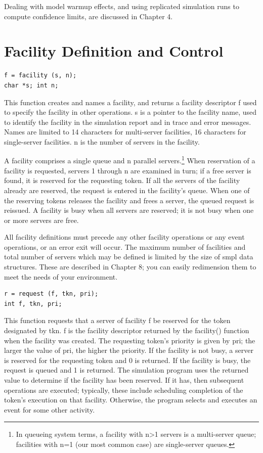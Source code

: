 Dealing with model warmup effects, and using replicated simulation runs to
compute confidence limits, are discussed in Chapter 4.

\section{Facility Definition and Control}
\label{sec:smpl-facility-definition}

\begin{verbatim}
f = facility (s, n);
char *s; int n;
\end{verbatim}

This function creates and names a facility, and returns a facility descriptor
f used to specify the facility in other operations. s is a pointer to the
facility name, used to identify the facility in the simulation report and in
trace and error messages. Names are limited to 14 characters for multi-server
facilities, 16 characters for single-server facilities. n is the number of
servers in the facility.

A facility comprises a single queue and n parallel servers.\footnote{In
queueing system terms, a facility with n>1 servers is a multi-server queue;
facilities with n=1 (our most common case) are single-server queues.} When
reservation of a facility is requested, servers 1 through n are examined in
turn; if a free server is found, it is reserved for the requesting token. If
all the servers of the facility already are reserved, the request is entered
in the facility's queue. When one of the reserving tokens releases the
facility and frees a server, the queued request is reissued. A facility is
busy when all servers are reserved; it is not busy when one or more servers
are free.

All facility definitions must precede any other facility operations or any
event operations, or an error exit will occur. The maximum number of
facilities and total number of servers which may be defined is limited by the
size of smpl data structures. These are described in Chapter 8; you can easily
redimension them to meet the needs of your environment.

\begin{verbatim}
r = request (f, tkn, pri);
int f, tkn, pri;
\end{verbatim}

This function requests that a server of facility f be reserved for the token
designated by tkn. f is the facility descriptor returned by the facility()
\noindent function when the facility was created. The requesting token's priority is
given by pri; the larger the value of pri, the higher the priority. If the
facility is not busy, a server is reserved for the requesting token and 0 is
returned. If the facility is busy, the request is queued and 1 is returned.
The simulation program uses the returned value to determine if the facility
has been reserved. If it has, then subsequent operations are executed;
typically, these include scheduling completion of the token's execution on
that facility. Otherwise, the program selects and executes an event for some
other activity.


